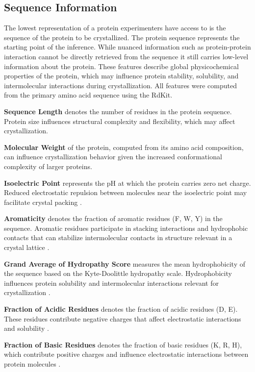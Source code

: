 \subsection{Sequence Information}\label{sec:methods/feature_engineering/sequenceInformation}

The lowest representation of a protein experimenters have access to is the sequence of the protein to be crystallized. The protein sequence represents the starting point of the inference. While nuanced information such as protein-protein interaction cannot be directly retrieved from the sequence it still carries low-level information about the protein. These features describe global physicochemical properties of the protein, which may influence protein stability, solubility, and intermolecular interactions during crystallization. All features were computed from the primary amino acid sequence using the RdKit.

\textbf{Sequence Length} denotes the number of residues in the protein sequence. Protein size influences structural complexity and flexibility, which may affect crystallization.

\textbf{Molecular Weight} of the protein, computed from its amino acid composition, can influence crystallization behavior given the increased conformational complexity of larger proteins. 

\textbf{Isoelectric Point} represents the pH at which the protein carries zero net charge. Reduced electrostatic repulsion between molecules near the isoelectric point may facilitate crystal packing \citep{Kirkwood2015}.

\textbf{Aromaticity} denotes the fraction of aromatic residues (F, W, Y) in the sequence. Aromatic residues participate in stacking interactions and hydrophobic contacts that can stabilize intermolecular contacts in structure relevant in a crystal lattice \citep{Burley1985}.

\textbf{Grand Average of Hydropathy Score} measures the mean hydrophobicity of the sequence based on the Kyte-Doolittle hydropathy scale. Hydrophobicity influences protein solubility and intermolecular interactions relevant for crystallization \citep{PriceII2009}.

\textbf{Fraction of Acidic Residues} denotes the fraction of acidic residues (D, E). These residues contribute negative charges that affect electrostatic interactions and solubility \citep{PriceII2009}.

\textbf{Fraction of Basic Residues} denotes the fraction of basic residues (K, R, H), which contribute positive charges and influence electrostatic interactions between protein molecules \citep{PriceII2009}.

